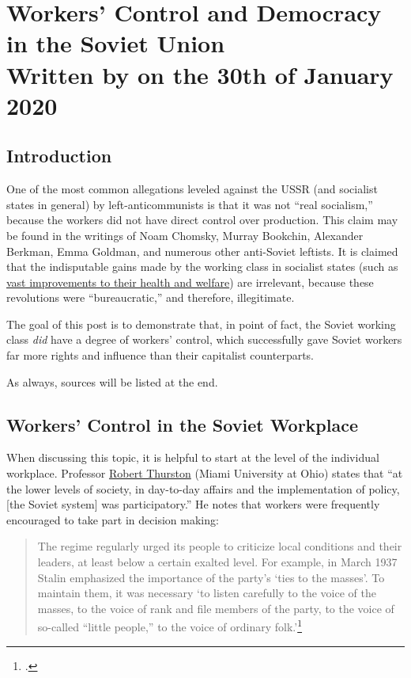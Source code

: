 \section[Workers' Control and Democracy in the Soviet Union]{Workers' Control and Democracy in the Soviet Union\\\small{Written by  on the 30th of January 2020}}

\subsection*{Introduction}

One of the most common allegations leveled against the USSR (and
socialist states in general) by left-anticommunists is that it was not
``real socialism,'' because the workers did not have direct control over
production. This claim may be found in the writings of Noam Chomsky,
Murray Bookchin, Alexander Berkman, Emma Goldman, and numerous other
anti-Soviet leftists. It is claimed that the indisputable gains made by
the working class in socialist states (such as
\href{https://journals.sagepub.com/doi/abs/10.2190/B2TP-3R5M-Q7UP-DUA2}{vast
improvements to their health and welfare}) are irrelevant, because these
revolutions were ``bureaucratic,'' and therefore, illegitimate.

The goal of this post is to demonstrate that, in point of fact, the
Soviet working class \emph{did} have a degree of workers' control, which
successfully gave Soviet workers far more rights and influence than
their capitalist counterparts.

As always, sources will be listed at the end.

\subsection*{Workers' Control in the Soviet Workplace}

When discussing this topic, it is helpful to start at the level of the
individual workplace. Professor
\href{http://miamioh.edu/cas/academics/departments/history/about/faculty/emeriti-faculty/thurston/index.html}{Robert
Thurston} (Miami University at Ohio) states that ``at the lower levels
of society, in day-to-day affairs and the implementation of policy,
{[}the Soviet system{]} was participatory.'' He notes that workers were
frequently encouraged to take part in decision making:

\begin{quote}
The regime regularly urged its people to criticize local conditions and
their leaders, at least below a certain exalted level. For example, in
March 1937 Stalin emphasized the importance of the party's `ties to the
masses'. To maintain them, it was necessary `to listen carefully to the
voice of the masses, to the voice of rank and file members of the party,
to the voice of so-called ``little people,'' to the voice of ordinary
  folk.'\footcite{thurston2002reassessing}
\end{quote}

